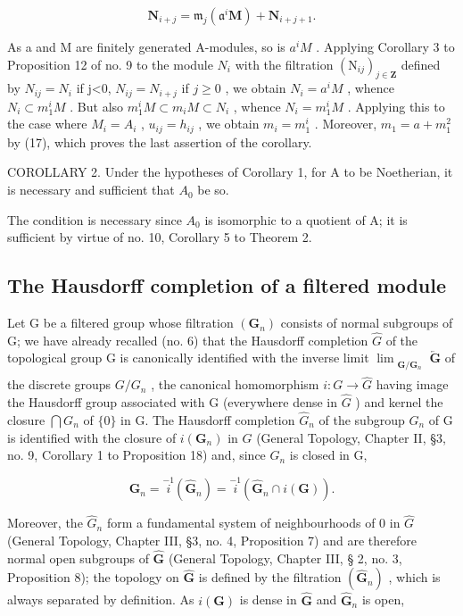 \[
\mathbf {N} _ {i + j} = \mathfrak {m} _ {j} (\mathfrak {a} ^ {i} \mathbf {M}) + \mathbf {N} _ {i + j + 1}.
\]

As a and M are finitely generated A-modules, so is \(a^{i}M\) . Applying Corollary 3 to Proposition 12 of no. 9 to the module \(N_{i}\) with the filtration \((\mathrm{N}_{ij})_{j\in\mathbf{Z}}\) defined by \(N_{ij}=N_{i}\) if j\textless0, \(N_{ij}=N_{i+j}\) if \(j\geqslant0\) , we obtain \(N_{i}=a^{i}M\) , whence \(N_{i}\subset m_{1}^{i}M\) . But also \(m_{1}^{i}M\subset m_{i}M\subset N_{i}\) , whence \(N_{i}=m_{1}^{i}M\) . Applying this to the case where \(M_{i}=A_{i}\) , \(u_{ij}=h_{ij}\) , we obtain \(m_{i}=m_{1}^{i}\) . Moreover, \(m_{1}=a+m_{1}^{2}\) by (17), which proves the last assertion of the corollary.

COROLLARY 2. Under the hypotheses of Corollary 1, for A to be Noetherian, it is necessary and sufficient that \(A_{0}\) be so.

The condition is necessary since \(A_{0}\) is isomorphic to a quotient of A; it is sufficient by virtue of no. 10, Corollary 5 to Theorem 2.

\subsection{The Hausdorff completion of a filtered module}

Let G be a filtered group whose filtration \((\mathbf{G}_{n})\) consists of normal subgroups of G; we have already recalled (no. 6) that the Hausdorff completion \(\hat{G}\) of the topological group G is canonically identified with the inverse limit \(\lim_{\substack{\mathbf{G}/\mathbf{G}_{n}\\ }} \overleftarrow{\mathbf{G}}\) of the discrete groups \(G/G_{n}\) , the canonical homomorphism \(i: G \to \hat{G}\) having image the Hausdorff group associated with G (everywhere dense in \(\hat{G}\) ) and kernel the closure \(\bigcap G_{n}\) of \(\{0\}\) in G. The Hausdorff completion \(\hat{G}_{n}\) of the subgroup \(G_{n}\) of G is identified with the closure of \(i(\mathbf{G}_{n})\) in \(\hat{G}\) (General Topology, Chapter II, §3, no. 9, Corollary 1 to Proposition 18) and, since \(G_{n}\) is closed in G,


\[
\mathbf {G} _ {n} = \stackrel {- 1} {i} (\hat {\mathbf {G}} _ {n}) = \stackrel {- 1} {i} (\hat {\mathbf {G}} _ {n} \cap i (\mathbf {G})).\tag{18}
\]

Moreover, the \(\hat{G}_n\) form a fundamental system of neighbourhoods of 0 in \(\hat{G}\) (General Topology, Chapter III, §3, no. 4, Proposition 7) and are therefore normal open subgroups of \(\hat{\mathbf{G}}\) (General Topology, Chapter III, § 2, no. 3, Proposition 8); the topology on \(\hat{\mathbf{G}}\) is defined by the filtration \((\hat{\mathbf{G}}_n)\) , which is always separated by definition. As \(i(\mathbf{G})\) is dense in \(\hat{\mathbf{G}}\) and \(\hat{\mathbf{G}}_n\) is open,

